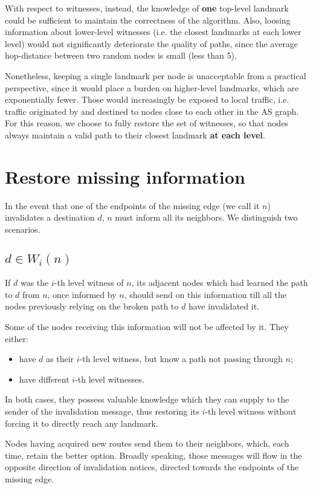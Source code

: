 \documentclass[a4paper,11pt,oneside]{report}
\begin{document}
\bigskip
With respect to witnesses, instead, the knowledge of \textbf{one} top-level landmark could be sufficient to maintain the correctness of the algorithm. Also, loosing information about lower-level witnesses (i.e. the closest landmarks at each lower level) would not significantly deteriorate the quality of paths, since the average hop-distance between two random nodes is small (less than 5).

Nonetheless, keeping a single landmark per node is unacceptable from a practical perspective, since it would place a burden on higher-level landmarks, which are exponentially fewer. Those would increasingly be exposed to local traffic, i.e. traffic originated by and destined to nodes close to each other in the AS graph. For this reason, we choose to fully restore the set of witnesses, so that nodes always maintain a valid path to their closest landmark \textbf{at each level}.

\section{Restore missing information}
\label{sec.tz-restoration}
In the event that one of the endpoints of the missing edge (we call it $n$) invalidates a destination $d$, $n$ must inform all its neighbors. We distinguish two scenarios.

\subsection{$d \in W_i(n)$}
If $d$ was the $i$-th level witness of $n$, its adjacent nodes which had learned the path to $d$ from $n$, once informed by $n$, should send on this information till all the nodes previously relying on the broken path to $d$ have invalidated it.

Some of the nodes receiving this information will not be affected by it. They either:
\begin{itemize}
\item have $d$ as their $i$-th level witness, but know a path not passing through $n$;
\item have different $i$-th level witnesses.
\end{itemize}
In both cases, they possess valuable knowledge which they can supply to the sender of the invalidation message, thus restoring its $i$-th level witness without forcing it to directly reach any landmark.

Nodes having acquired new routes send them to their neighbors, which, each time, retain the better option. Broadly speaking, those messages will flow in the opposite direction of invalidation notices, directed towards the endpoints of the missing edge.
\end{document}
